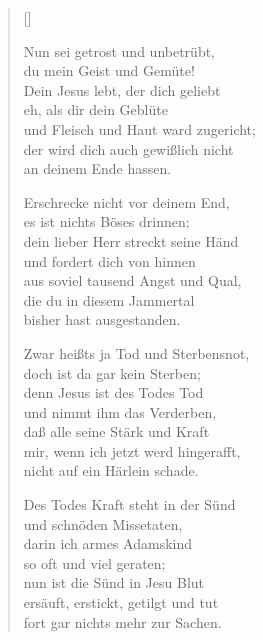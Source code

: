 \begin{multicols}{2}
\settowidth{\versewidth}{Erschrecke nicht vor deinem End,}
\begin{verse}[\versewidth]

 Nun sei getrost und unbetrübt,\\
du mein Geist und Gemüte!\\
Dein Jesus lebt, der dich geliebt\\
eh, als dir dein Geblüte\\
und Fleisch und Haut ward zugericht;\\
der wird dich auch gewißlich nicht\\
an deinem Ende hassen.

 Erschrecke nicht vor deinem End,\\
es ist nichts Böses drinnen;\\
dein lieber Herr streckt seine Händ\\
und fordert dich von hinnen\\
aus soviel tausend Angst und Qual,\\
die du in diesem Jammertal\\
bisher hast ausgestanden.

 Zwar heißts ja Tod und Sterbensnot,\\
doch ist da gar kein Sterben;\\
denn Jesus ist des Todes Tod\\
und nimmt ihm das Verderben,\\
daß alle seine Stärk und Kraft\\
mir, wenn ich jetzt werd hingerafft,\\
nicht auf ein Härlein schade.

 Des Todes Kraft steht in der Sünd\\
und schnöden Missetaten,\\
darin ich armes Adamskind\\
so oft und viel geraten;\\
nun ist die Sünd in Jesu Blut\\
ersäuft, erstickt, getilgt und tut\\
fort gar nichts mehr zur Sachen.


\end{verse}
\end{multicols}
